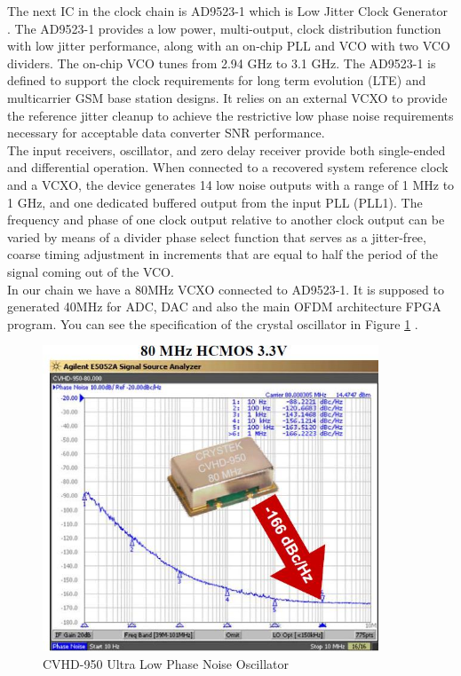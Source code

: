 The next IC in the clock chain is AD9523-1 which is Low Jitter Clock Generator \cite{ad9523}. The AD9523-1 provides a low power, multi-output, clock distribution function with low jitter performance, along with an on-chip PLL and VCO with two VCO dividers. The on-chip VCO tunes from 2.94 GHz to 3.1 GHz. The AD9523-1 is defined to support the clock requirements for
long term evolution (LTE) and multicarrier GSM base station designs. It relies on an external VCXO to provide the reference
jitter cleanup to achieve the restrictive low phase noise requirements necessary for acceptable data converter SNR performance.\\
The input receivers, oscillator, and zero delay receiver provide both single-ended and differential operation. When connected to a recovered system reference clock and a VCXO, the device generates 14 low noise outputs with a range of 1 MHz to 1 GHz, and one dedicated buffered output from the input PLL (PLL1). The frequency and phase of one clock output relative to another clock output can be varied by means of a divider phase select function that serves as a jitter-free, coarse timing adjustment in increments that are equal to half the period of the signal coming out of the VCO.\\
In  our chain we have a 80MHz VCXO connected to AD9523-1. It is supposed to generated 40MHz for ADC, DAC and also the main OFDM architecture FPGA program. You can see the specification of the crystal oscillator in Figure \ref{fig:cvhd} \cite{cvhd} .\\

\begin{figure}
\centering
\includegraphics[width=10cm]{content/fig/cvhd.JPG}
\caption{CVHD-950 Ultra Low Phase Noise Oscillator}
\label{fig:cvhd}
\end{figure}


